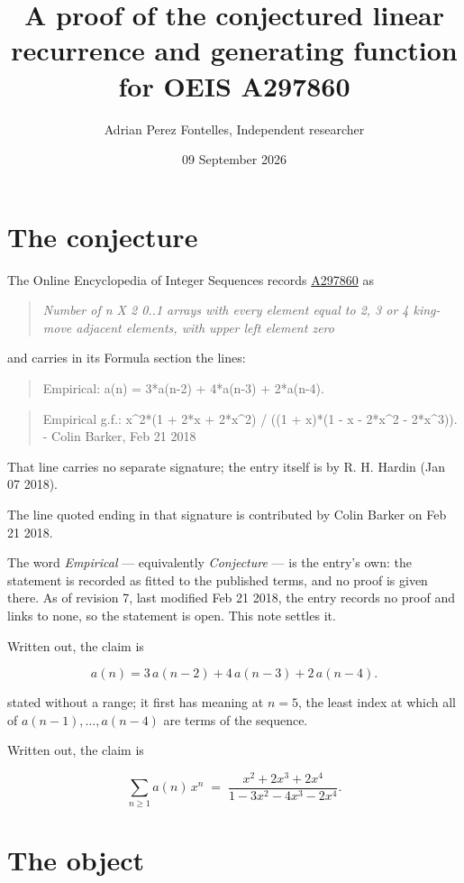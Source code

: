 \documentclass[11pt]{article}
\title{A proof of the conjectured linear recurrence and generating function for OEIS A297860}
\author{Adrian Perez Fontelles, Independent researcher}
\date{09 September 2026}
\theoremstyle{definition}
\begin{document}
\maketitle
\section{The conjecture}

The Online Encyclopedia of Integer Sequences records \href{https://oeis.org/A297860}{A297860} as

\begin{quote}\itshape Number of n X 2 0..1 arrays with every element equal to 2, 3 or 4 king-move adjacent elements, with upper left element zero\end{quote}

and carries in its Formula section the lines:

\begin{quote}\ttfamily Empirical: a(n) = 3*a(n-2) + 4*a(n-3) + 2*a(n-4).\end{quote}

\begin{quote}\ttfamily Empirical g.f.: x\textasciicircum{}2*(1 + 2*x + 2*x\textasciicircum{}2) / ((1 + x)*(1 - x - 2*x\textasciicircum{}2 - 2*x\textasciicircum{}3)). - Colin Barker, Feb 21 2018\end{quote}

That line carries no separate signature; the entry itself is by R. H. Hardin (Jan 07 2018).

The line quoted ending in that signature is contributed by Colin Barker on Feb 21 2018.

The word {\itshape Empirical} --- equivalently {\itshape Conjecture} --- is the entry's own: the statement is recorded as fitted to the published terms, and no proof is given there. As of revision 7, last modified Feb 21 2018, the entry records no proof and links to none, so the statement is open. This note settles it.

Written out, the claim is

\[a(n) = 3\,a(n-2) + 4\,a(n-3) + 2\,a(n-4).\]

stated without a range; it first has meaning at $n = 5$, the least index at which all of $a(n-1),\dots,a(n-4)$ are terms of the sequence.

Written out, the claim is

\[\sum_{n \ge 1} a(n)\,x^n \;=\; \frac{x^{2} + 2x^{3} + 2x^{4}}{1 - 3x^{2} - 4x^{3} - 2x^{4}}.\]

\section{The object}
\end{document}
